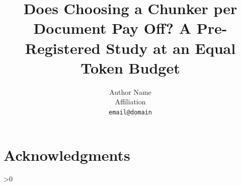 \documentclass[11pt]{article}
\title{Does Choosing a Chunker per Document Pay Off? A Pre-Registered Study at an Equal Token Budget}
\author{Author Name \\ Affiliation \\ \texttt{email@domain}}
\begin{document}
\maketitle

\begin{abstract}

\end{abstract}







\FloatBarrier  %



\ifdefined\PaperModeFinal
\section*{Acknowledgments}
\fi

>0 \fi

\appendix

\end{document}
